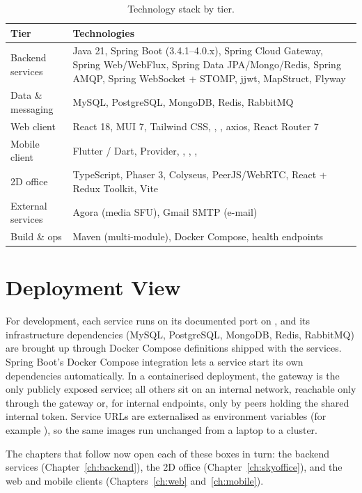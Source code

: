 \begin{table}[htbp]
\centering
\caption{Technology stack by tier.}
\label{tab:stack}
\small
\begin{tabularx}{\textwidth}{L{3.2cm} X}
\toprule
\textbf{Tier} & \textbf{Technologies} \\
\midrule
Backend services & Java 21, Spring Boot (3.4.1--4.0.x), Spring Cloud Gateway, Spring Web/WebFlux, Spring Data JPA/Mongo/Redis, Spring AMQP, Spring WebSocket + STOMP, jjwt, MapStruct, Flyway \\
Data \& messaging & MySQL, PostgreSQL, MongoDB, Redis, RabbitMQ \\
Web client & React 18, MUI 7, Tailwind CSS, , , axios, React Router 7 \\
Mobile client & Flutter / Dart, Provider, , , ,  \\
2D office & TypeScript, Phaser 3, Colyseus, PeerJS/WebRTC, React + Redux Toolkit, Vite \\
External services & Agora (media SFU), Gmail SMTP (e-mail) \\
Build \& ops & Maven (multi-module), Docker Compose, health endpoints \\
\bottomrule
\end{tabularx}
\end{table}

\section{Deployment View}

For development, each service runs on its documented port on ,
and its infrastructure dependencies (MySQL, PostgreSQL, MongoDB, Redis, RabbitMQ)
are brought up through Docker Compose definitions shipped with the services.
Spring Boot's Docker Compose integration lets a service start its own
dependencies automatically. In a containerised deployment, the gateway is the
only publicly exposed service; all others sit on an internal network, reachable
only through the gateway or, for internal endpoints, only by peers holding the
shared internal token. Service URLs are externalised as environment variables
(for example ), so the same images run unchanged from a
laptop to a cluster.

The chapters that follow now open each of these boxes in turn: the backend
services (Chapter~\ref{ch:backend}), the 2D office (Chapter~\ref{ch:skyoffice}),
and the web and mobile clients (Chapters~\ref{ch:web} and~\ref{ch:mobile}).

